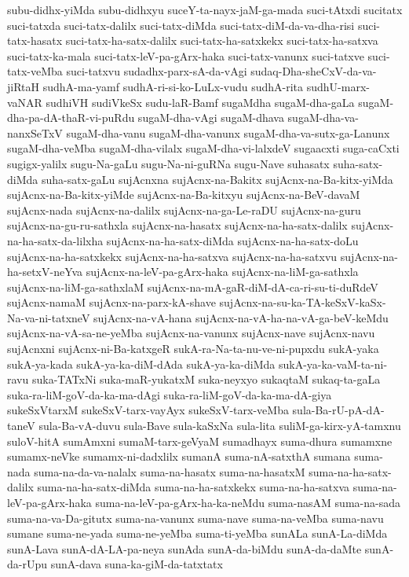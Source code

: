 {subu-didhx-yiMda
subu-didhxyu
suceY-ta-nayx-jaM-ga-mada
suci-tAtxdi
sucitatx
suci-tatxda
suci-tatx-dalilx
suci-tatx-diMda
suci-tatx-diM-da-va-dha-risi
suci-tatx-hasatx
suci-tatx-ha-satx-dalilx
suci-tatx-ha-satxkekx
suci-tatx-ha-satxva
suci-tatx-ka-mala
suci-tatx-leV-pa-gArx-haka
suci-tatx-vanunx
suci-tatxve
suci-tatx-veMba
suci-tatxvu
sudadhx-parx-sA-da-vAgi
sudaq-Dha-sheCxV-da-va-jiRtaH
sudhA-ma-yamf
sudhA-ri-si-ko-LuLx-vudu
sudhA-rita
sudhU-marx-vaNAR
sudhiVH
sudiVkeSx
sudu-laR-Bamf
sugaMdha
sugaM-dha-gaLa
sugaM-dha-pa-dA-thaR-vi-puRdu
sugaM-dha-vAgi
sugaM-dhava
sugaM-dha-va-nanxSeTxV
sugaM-dha-vanu
sugaM-dha-vanunx
sugaM-dha-va-sutx-ga-Lanunx
sugaM-dha-veMba
sugaM-dha-vilalx
sugaM-dha-vi-lalxdeV
sugaacxti
suga-caCxti
sugigx-yalilx
sugu-Na-gaLu
sugu-Na-ni-guRNa
sugu-Nave
suhasatx
suha-satx-diMda
suha-satx-gaLu
sujAcnxna
sujAcnx-na-Bakitx
sujAcnx-na-Ba-kitx-yiMda
sujAcnx-na-Ba-kitx-yiMde
sujAcnx-na-Ba-kitxyu
sujAcnx-na-BeV-davaM
sujAcnx-nada
sujAcnx-na-dalilx
sujAcnx-na-ga-Le-raDU
sujAcnx-na-guru
sujAcnx-na-gu-ru-sathxla
sujAcnx-na-hasatx
sujAcnx-na-ha-satx-dalilx
sujAcnx-na-ha-satx-da-lilxha
sujAcnx-na-ha-satx-diMda
sujAcnx-na-ha-satx-doLu
sujAcnx-na-ha-satxkekx
sujAcnx-na-ha-satxva
sujAcnx-na-ha-satxvu
sujAcnx-na-ha-setxV-neYva
sujAcnx-na-leV-pa-gArx-haka
sujAcnx-na-liM-ga-sathxla
sujAcnx-na-liM-ga-sathxlaM
sujAcnx-na-mA-gaR-diM-dA-ca-ri-su-ti-duRdeV
sujAcnx-namaM
sujAcnx-na-parx-kA-shave
sujAcnx-na-su-ka-TA-keSxV-kaSx-Na-va-ni-tatxneV
sujAcnx-na-vA-hana
sujAcnx-na-vA-ha-na-vA-ga-beV-keMdu
sujAcnx-na-vA-sa-ne-yeMba
sujAcnx-na-vanunx
sujAcnx-nave
sujAcnx-navu
sujAcnxni
sujAcnx-ni-Ba-katxgeR
sukA-ra-Na-ta-nu-ve-ni-pupxdu
sukA-yaka
sukA-ya-kada
sukA-ya-ka-diM-dAda
sukA-ya-ka-diMda
sukA-ya-ka-vaM-ta-ni-ravu
suka-TATxNi
suka-maR-yukatxM
suka-neyxyo
sukaqtaM
sukaq-ta-gaLa
suka-ra-liM-goV-da-ka-ma-dAgi
suka-ra-liM-goV-da-ka-ma-dA-giya
sukeSxVtarxM
sukeSxV-tarx-vayAyx
sukeSxV-tarx-veMba
sula-Ba-rU-pA-dA-taneV
sula-Ba-vA-duvu
sula-Bave
sula-kaSxNa
sula-lita
suliM-ga-kirx-yA-tamxnu
suloV-hitA
sumAmxni
sumaM-tarx-geVyaM
sumadhayx
suma-dhura
sumamxne
sumamx-neVke
sumamx-ni-dadxlilx
sumanA
suma-nA-satxthA
sumana
suma-nada
suma-na-da-va-nalalx
suma-na-hasatx
suma-na-hasatxM
suma-na-ha-satx-dalilx
suma-na-ha-satx-diMda
suma-na-ha-satxkekx
suma-na-ha-satxva
suma-na-leV-pa-gArx-haka
suma-na-leV-pa-gArx-ha-ka-neMdu
suma-nasAM
suma-na-sada
suma-na-va-Da-gitutx
suma-na-vanunx
suma-nave
suma-na-veMba
suma-navu
sumane
suma-ne-yada
suma-ne-yeMba
suma-ti-yeMba
sunALa
sunA-La-diMda
sunA-Lava
sunA-dA-LA-pa-neya
sunAda
sunA-da-biMdu
sunA-da-daMte
sunA-da-rUpu
sunA-dava
suna-ka-giM-da-tatxtatx
}
